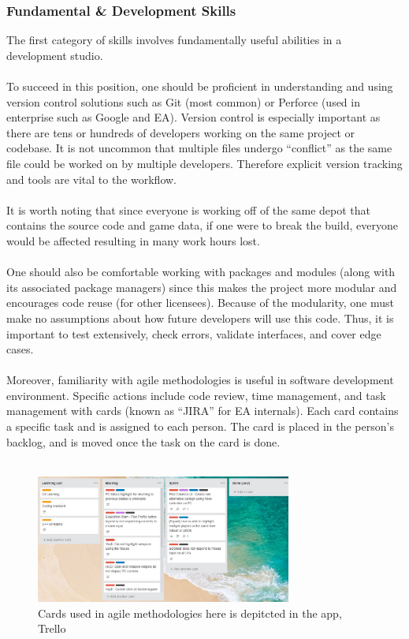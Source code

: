 \documentclass[10pt,letterpaper]{article}
\begin{document}
\subsubsection{Fundamental \& Development Skills}

The first category of skills involves fundamentally useful abilities in a development studio.\\
\\
To succeed in this position, one should be proficient in understanding and using version control solutions such as Git (most common) or Perforce (used in enterprise such as Google and EA). Version control is especially important as there are tens or hundreds of developers working on the same project or codebase. It is not uncommon that multiple files undergo ``conflict'' as the same file could be worked on by multiple developers. Therefore explicit version tracking and tools are vital to the workflow.\\
\\
It is worth noting that since everyone is working off of the same depot that contains the source code and game data, if one were to break the build, everyone would be affected resulting in many work hours lost.\\
\\
One should also be comfortable working with packages and modules (along with its associated package managers) since this makes the project more modular and encourages code reuse (for other licensees). Because of the modularity, one must make no assumptions about how future developers will use this code. Thus, it is important to test extensively, check errors, validate interfaces, and cover edge cases.\\
\\
Moreover, familiarity with agile methodologies is useful in software development environment. Specific actions include code review, time management, and task management with cards (known as ``JIRA'' for EA internals). Each card contains a specific task and is assigned to each person. The card is placed in the person's backlog, and is moved once the task on the card is done\cite{agile}.\\
\\
\begin{figure}[H]
	\centering
	\includegraphics[width=0.75\textwidth]{assets/cards}
	\caption{Cards used in agile methodologies here is depitcted in the app, Trello\cite{trello}}
	\label{fig:trello-cards}
\end{figure}
\end{document}
